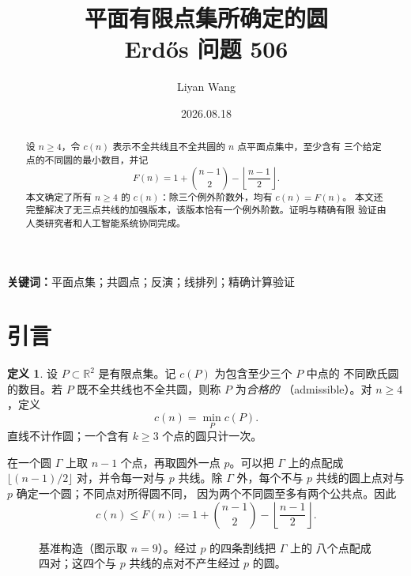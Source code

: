 \documentclass[11pt,a4paper]{ctexart}
\title{平面有限点集所确定的圆\\
\large Erd\H{o}s 问题 506}
\author{Liyan Wang}
\date{2026.08.18}
\theoremstyle{definition}
\newtheorem{definition}[theorem]{定义}
\begin{document}
\maketitle

\begin{abstract}
设 $n\ge4$，令 $c(n)$ 表示不全共线且不全共圆的 $n$ 点平面点集中，至少含有
三个给定点的不同圆的最小数目，并记
\[
F(n)=1+\binom{n-1}{2}-\left\lfloor\frac{n-1}{2}\right\rfloor.
\]
本文确定了所有 $n\ge4$ 的 $c(n)$：除三个例外阶数外，均有 $c(n)=F(n)$。
本文还完整解决了无三点共线的加强版本，该版本恰有一个例外阶数。证明与精确有限
验证由人类研究者和人工智能系统协同完成。
\end{abstract}

\noindent\textbf{关键词：}平面点集；共圆点；反演；线排列；精确计算验证

\begingroup
\setcounter{tocdepth}{1}
\small
\tableofcontents
\endgroup
\clearpage

\section{引言}

\begin{definition}
设 $P\subset\mathbb R^2$ 是有限点集。记 $c(P)$ 为包含至少三个 $P$ 中点的
不同欧氏圆的数目。若 $P$ 既不全共线也不全共圆，则称 $P$ 为\emph{合格的}
（admissible）。对 $n\ge4$，定义
\[
c(n)=\min_P c(P).
\]
直线不计作圆；一个含有 $k\ge3$ 个点的圆只计一次。
\end{definition}

在一个圆 $\Gamma$ 上取 $n-1$ 个点，再取圆外一点 $p$。可以把 $\Gamma$
上的点配成 $\lfloor(n-1)/2\rfloor$ 对，并令每一对与 $p$ 共线。除 $\Gamma$
外，每个不与 $p$ 共线的圆上点对与 $p$ 确定一个圆；不同点对所得圆不同，
因为两个不同圆至多有两个公共点。因此
\begin{equation}\label{eq:F}
 c(n)\le F(n):=1+\binom{n-1}{2}-\left\lfloor\frac{n-1}{2}\right\rfloor.
\end{equation}

\begin{figure}[ht]
\centering
{}
\caption{基准构造（图示取 $n=9$）。经过 $p$ 的四条割线把 $\Gamma$ 上的
八个点配成四对；这四个与 $p$ 共线的点对不产生经过 $p$ 的圆。}
\label{fig:benchmark}
\end{figure}
\end{document}
